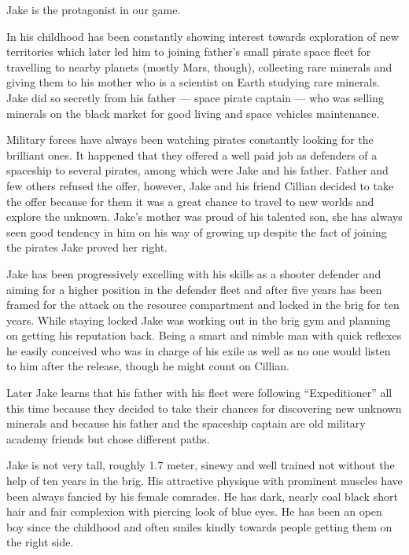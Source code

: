 \documentclass{article}
\begin{document}
Jake is the protagonist in our game.

In his childhood has been constantly showing interest towards exploration of new
territories which later led him to joining father's small pirate space fleet for
travelling to nearby planets (mostly Mars, though), collecting rare minerals and
giving them to his mother who is a scientist on Earth studying rare minerals.
Jake did so secretly from his father --- space pirate captain --- who was
selling minerals on the black market for good living and space vehicles
maintenance.

Military forces have always been watching pirates constantly looking for the
brilliant ones. It happened that they offered a well paid job as defenders of a
spaceship to several pirates, among which were Jake and his father. Father and
few others refused the offer, however, Jake and his friend Cillian decided to
take the offer because for them it was a great chance to travel to new worlds
and explore the unknown. Jake's mother was proud of his talented son, she has
always seen good tendency in him on his way of growing up despite the fact of
joining the pirates Jake proved her right.

Jake has been progressively excelling with his skills as a shooter defender and
aiming for a higher position in the defender fleet and after five years has been
framed for the attack on the resource compartment and locked in the brig for ten
years. While staying locked Jake was working out in the brig gym and planning on
getting his reputation back. Being a smart and nimble man with quick reflexes he
easily conceived who was in charge of his exile as well as no one would listen
to him after the release, though he might count on Cillian.

Later Jake learns that his father with his fleet were following ``Expeditioner''
all this time because they decided to take their chances for discovering new
unknown minerals and because his father and the spaceship captain are old
military academy friends but chose different paths.

Jake is not very tall, roughly 1.7 meter, sinewy and well trained not without
the help of ten years in the brig. His attractive physique with prominent
muscles have been always fancied by his female comrades. He has dark, nearly
coal black short hair and fair complexion with piercing look of blue eyes. He
has been an open boy since the childhood and often smiles kindly towards people
getting them on the right side.
\end{document}
